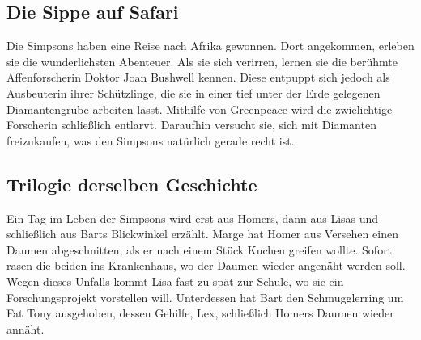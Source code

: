 \subsection{Die Sippe auf Safari}
Die Simpsons haben eine Reise nach Afrika gewonnen. Dort angekommen, erleben sie die wunderlichsten Abenteuer. Als sie sich verirren, lernen sie die berühmte Affenforscherin Doktor Joan Bushwell kennen. Diese entpuppt sich jedoch als Ausbeuterin ihrer Schützlinge, die sie in einer tief unter der Erde gelegenen Diamantengrube arbeiten lässt. Mithilfe von Greenpeace wird die zwielichtige Forscherin schließlich entlarvt. Daraufhin versucht sie, sich mit Diamanten freizukaufen, was den Simpsons natürlich gerade recht ist.


	
\subsection{Trilogie derselben Geschichte}\label{CABF14}
Ein Tag im Leben der Simpsons wird erst aus Homers, dann aus Lisas und schließlich aus Barts Blickwinkel erzählt. Marge hat Homer aus Versehen einen Daumen abgeschnitten, als er nach einem Stück Kuchen greifen wollte. Sofort rasen die beiden ins Krankenhaus, wo der Daumen wieder angenäht werden soll. Wegen dieses Unfalls kommt Lisa fast zu spät zur Schule, wo sie ein Forschungsprojekt vorstellen will. Unterdessen hat Bart den Schmugglerring um Fat Tony ausgehoben, dessen Gehilfe, Lex, schließlich Homers Daumen wieder annäht.

